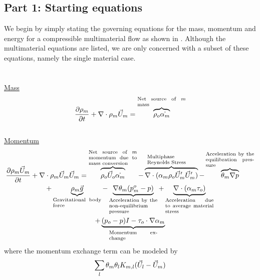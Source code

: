 \documentclass[fleqn]{article}
\begin{document}
\subsection{\textsf{Part 1: Starting equations}}
We begin by simply stating the governing equations for the mass,
momentum and energy for a compressible multimaterial flow as shown in
.  Although the multimaterial equations are listed,
we are only concerned with a subset of these equations, namely the single
material case.\\
\\
\underline{\hspace{5in}}\\
\underline{\textsf{Mass}}
\begin{equation}
    \label{eq:cont_mass}
    \pd{\rho_m}{t} + \nabla \cdot \rho_{m}\um = 
    \overbrace{\rhoo \dot{\alpham}}^{\pboxsmall{Net source of $m$ mass}  }
\end{equation}
\underline{\hspace{5in}}\\
\underline{\textsf{Momentum}}
\begin{multline}
    \label{eq:cont_mom}
    \pd{\rho_{m} \um}{t} + \nabla \cdot \rho_m \um \um = 
    \overbrace{ \rhoo \uo\dot{\alpham} }^{\pboxsmall{ Net source of $m$ momentum due to mass conversion} }
-   \overbrace{ \nabla \cdot (\alpham \rhoo \um^\prime \um^\prime) }^{ \pboxsmall{Multiphase Reynolds Stress} }
-   \overbrace{ \theta_m \nabla{p} }^{ \pboxsmall{Acceleration by the equilibration pressure } }\\
+   \underbrace{ \rhom \vec{g} }_{\pboxsmall{ Gravitational body force } }
-   \underbrace{ \nabla \theta_m(p^{o}_{m} - p) }_{\pboxsmall{ Acceleration by the non-equilibrium pressure} } 
+   \underbrace{ \nabla \cdot (\alpham \tau_o) }_{ \pboxsmall{ Acceleration due to average material stress } }\\
+   \underbrace{ (p_o - p)I - \tau_o \cdot \nabla \alpham }_{\pboxsmall{Momentum exchange}}
\end{multline}
%
where the momentum exchange term can be modeled by 
%
\begin{equation}
    \sum_{l} \theta_m \theta_l K_{m,l}(\vec{U}_l - \um)
\end{equation}
\underline{\hspace{5in}}\\
\end{document}
